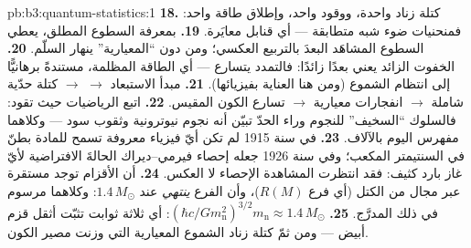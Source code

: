 \begin{solution}{pb:b3:quantum-statistics:1}
\textbf{18.} كتلة زناد واحدة، ووقود واحد، وإطلاق طاقة واحد:
فمنحنيات ضوء شبه متطابقة --- أي قنابل معايَرة.
\textbf{19.} بمعرفة السطوع المطلق، يعطي السطوع
المشاهَد البعدَ بالتربيع العكسي؛ ومن دون
``المعيارية'' ينهار السلّم.
\textbf{20.} الخفوت الزائد يعني بعدًا زائدًا: فالتمدد
يتسارع --- أي الطاقة المظلمة، مستندةً برهانيًّا إلى انتظام
الشموع (ومن هنا العناية بفيزيائها).
\textbf{21.} مبدأ الاستبعاد $\to$  $\to$
كتلة حدّية شاملة $\to$ انفجارات معيارية $\to$
تسارع الكون المقيس.
\textbf{22.} اتبع الرياضيات حيث تقود: فالسلوك
``السخيف'' للنجوم وراء الحدّ تبيّن أنه
نجوم نيوترونية وثقوب سود --- وكلاهما مفهرس اليوم
بالآلاف.
\textbf{23.} في سنة 1915 لم تكن أيّ فيزياء معروفة تسمح للمادة بطنّ في
السنتيمتر المكعب؛ وفي سنة 1926 جعله إحصاء فيرمي--ديراك
الحالةَ الافتراضية لأيّ غاز بارد كثيف: فقد انتظرت المشاهدة
الإحصاء لا العكس.
\textbf{24.} أن الأقزام توجد مستقرة عبر مجال من الكتل
(أي فرع $R(M)$)، وأن الفرع \emph{ينتهي} عند
$1.4\,M_\odot$: وكلاهما مرسوم في ذلك المدرَّج.
\textbf{25.} $(\hbar c/Gm_{\text{n}}^2)^{3/2}m_{\text{n}} \approx
1.4\,M_\odot$: أي ثلاثة ثوابت تثبّت أثقل قزم أبيض ---
ومن ثمّ كتلة زناد الشموع المعيارية التي وزنت
مصير الكون.
\end{solution}
